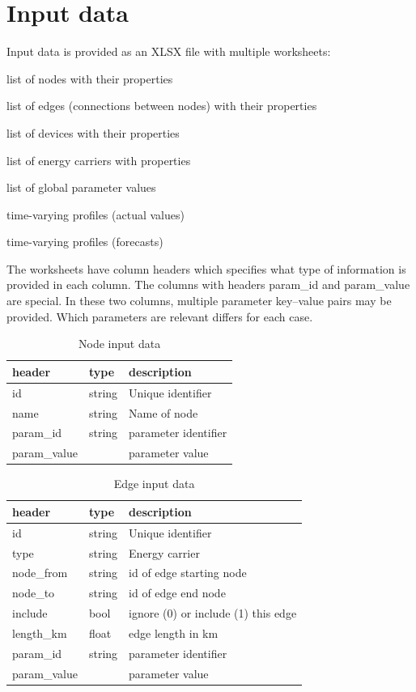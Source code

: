 \documentclass[12pt]{article}
\begin{document}
\section{Input data}
Input data is provided as an XLSX file with multiple worksheets:

\begin{description}[labelindent=\parindent,topsep=6pt]
\item[node] list of nodes with their properties
\item[edge] list of edges (connections between nodes) with their properties
\item[device] list of devices with their properties
\item[carriers] list of energy carriers with properties
\item[parameters] list of global parameter values
\item[profiles] time-varying profiles (actual values)
\item[profiles\_forecast] time-varying profiles (forecasts)
\end{description}

The worksheets have column headers which specifies what type of information is provided in each column. The columns with headers param\_id and param\_value are special. In these two columns, multiple parameter key--value pairs may be provided. Which parameters are relevant differs for each case.

\begin{table}[h]
\caption{Node input data}
\begin{tabular}{lll}
	\hline
	header & type & description \\
	\hline
	id & string & Unique identifier \\
	name & string & Name of node \\
	param\_id & string & parameter identifier \\
	param\_value & & parameter value
\end{tabular}
\end{table}

\begin{table}[h]
\caption{Edge input data}
\begin{tabular}{lll}
	\hline
	header & type & description \\
	\hline
	id & string & Unique identifier \\
	type & string & Energy carrier \\
	node\_from & string &  id of edge starting node \\
	node\_to & string &  id of edge end node \\
	include & bool & ignore (0) or include (1) this edge \\
	length\_km & float & edge length in km \\
	param\_id & string & parameter identifier \\
	param\_value & & parameter value
\end{tabular}
\end{table}
\end{document}
